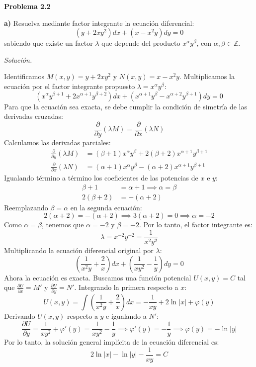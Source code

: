 \documentclass[12pt,letterpaper]{article}
\begin{document}
\bigskip

\textbf{Problema 2.2}

\medskip
\textbf{a)} Resuelva mediante factor integrante la ecuación diferencial:
\[
  (y + 2xy^2)dx + (x - x^2y)dy = 0
\]
sabiendo que existe un factor $\lambda$ que depende del producto $x^\alpha y^\beta$, con $\alpha, \beta \in \mathbb{Z}$.

\medskip
\textit{Solución.}

Identificamos $M(x,y) = y + 2xy^2$ y $N(x,y) = x - x^2y$. Multiplicamos la ecuación por el factor integrante propuesto $\lambda = x^\alpha y^\beta$:
\[
  (x^\alpha y^{\beta+1} + 2x^{\alpha+1} y^{\beta+2})dx + (x^{\alpha+1} y^\beta - x^{\alpha+2} y^{\beta+1})dy = 0
\]
Para que la ecuación sea exacta, se debe cumplir la condición de simetría de las derivadas cruzadas:
\[
  \frac{\partial}{\partial y}(\lambda M) = \frac{\partial}{\partial x}(\lambda N)
\]
Calculamos las derivadas parciales:
\begin{align*}
  \frac{\partial}{\partial y}(\lambda M) &= (\beta + 1)x^\alpha y^\beta + 2(\beta + 2)x^{\alpha+1} y^{\beta+1} \\
  \frac{\partial}{\partial x}(\lambda N) &= (\alpha + 1)x^\alpha y^\beta - (\alpha + 2)x^{\alpha+1} y^{\beta+1}
\end{align*}
Igualando término a término los coeficientes de las potencias de $x$ e $y$:
\begin{align*}
  \beta + 1 &= \alpha + 1 \implies \alpha = \beta \\
  2(\beta + 2) &= -(\alpha + 2)
\end{align*}
Reemplazando $\beta = \alpha$ en la segunda ecuación:
\[
  2(\alpha + 2) = -(\alpha + 2) \implies 3(\alpha + 2) = 0 \implies \alpha = -2
\]
Como $\alpha = \beta$, tenemos que $\alpha = -2$ y $\beta = -2$. Por lo tanto, el factor integrante es:
\[
  \lambda = x^{-2} y^{-2} = \frac{1}{x^2 y^2}
\]
Multiplicando la ecuación diferencial original por $\lambda$:
\[
  \left(\frac{1}{x^2 y} + \frac{2}{x}\right)dx + \left(\frac{1}{xy^2} - \frac{1}{y}\right)dy = 0
\]
Ahora la ecuación es exacta. Buscamos una función potencial $U(x,y) = C$ tal que $\frac{\partial U}{\partial x} = M'$ y $\frac{\partial U}{\partial y} = N'$. Integrando la primera respecto a $x$:
\[
  U(x,y) = \int \left(\frac{1}{x^2 y} + \frac{2}{x}\right)dx = -\frac{1}{xy} + 2\ln|x| + \varphi(y)
\]
Derivando $U(x,y)$ respecto a $y$ e igualando a $N'$:
\[
  \frac{\partial U}{\partial y} = \frac{1}{xy^2} + \varphi'(y) = \frac{1}{xy^2} - \frac{1}{y} \implies \varphi'(y) = -\frac{1}{y} \implies \varphi(y) = -\ln|y|
\]
Por lo tanto, la solución general implícita de la ecuación diferencial es:
\[
  2\ln|x| - \ln|y| - \frac{1}{xy} = C
\]
\end{document}
